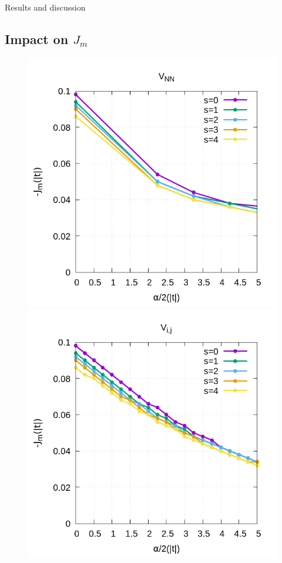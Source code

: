\documentclass[12pt,twoside]{report}
\begin{document}
\begin{chapter}{Results and discussion}
	\subsection{Impact on $J_m$}
	\begin{figure}[h!]
		\centering
		\hspace{-2cm}
		\begin{minipage}{0.4\textwidth}
			\includegraphics[scale=0.3]{J_vs_xrepv1.png}
		\end{minipage}
		\hspace{2cm}
		\begin{minipage}{0.4\textwidth}
			\includegraphics[scale=0.3]{J_vs_xrepvn.png}

\end{minipage}
\end{figure}
\end{chapter}
\end{document}
